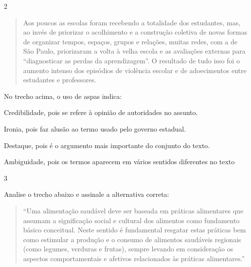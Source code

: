 \num{2}

\begin{quote}
Aos poucos as escolas foram recebendo a totalidade dos estudantes, mas,
ao invés de priorizar o acolhimento e a construção coletiva de novas
formas de organizar tempos, espaços, grupos e relações, muitas redes,
com a de São Paulo, priorizaram a volta à velha escola e as avaliações
externas para ``diagnosticar as perdas da aprendizagem''. O resultado de
tudo isso foi o aumento intenso dos episódios de violência escolar e de
adoecimentos entre estudantes e professores.
\end{quote}


No trecho acima, o uso de aspas indica:

\begin{escolha}

  \item Credibilidade, pois se refere à opinião de autoridades no assunto.

  \item Ironia, pois faz alusão ao termo usado pelo governo estadual.

  \item Destaque, pois é o argumento mais importante do conjunto do texto.

  \item Ambiguidade, pois os termos aparecem em vários sentidos diferentes no texto

\end{escolha}

\num{3}

Analise o trecho abaixo e assinale a alternativa correta:

\begin{quote}

``Uma alimentação saudável deve ser baseada em práticas alimentares que
assumam a significação social e cultural dos alimentos como fundamento
básico conceitual. Neste sentido é fundamental resgatar estas práticas
bem como estimular a produção e o consumo de alimentos saudáveis
regionais (como legumes, verduras e frutas), sempre levando em
consideração os aspectos comportamentais e afetivos relacionados às
práticas alimentares.''

\end{quote}


